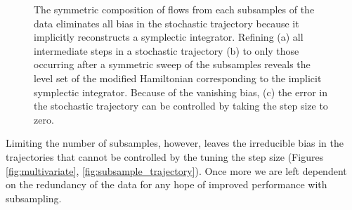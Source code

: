 \documentclass{article}
\begin{document}
\begin{figure}
\centering
{}
\caption{The symmetric composition of flows from each subsamples of the data 
eliminates all bias in the stochastic trajectory because it implicitly reconstructs a 
symplectic integrator.  Refining (a) all intermediate steps in a stochastic trajectory 
(b) to only those occurring after a symmetric sweep of the subsamples reveals
the level set of the modified Hamiltonian corresponding to the implicit
symplectic integrator.  Because of the vanishing bias, (c) the error in the
stochastic trajectory can be controlled by taking the step size to zero. }
\label{fig:symmetric_stochastic}
\end{figure}

Limiting the number of subsamples, however, leaves the irreducible bias
in the trajectories that cannot be controlled by the tuning the step size
(Figures \ref{fig:multivariate}, \ref{fig:subsample_trajectory}).  Once more 
we are left dependent on the redundancy of the data for any hope of improved 
performance with subsampling.
\end{document}
